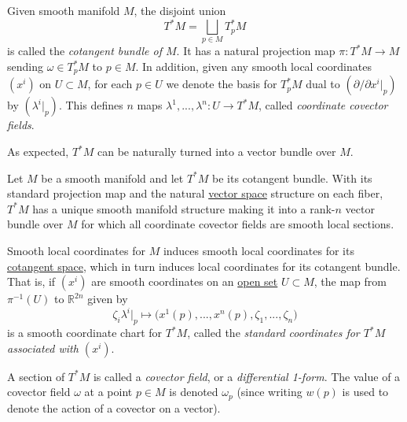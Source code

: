 \documentclass{article}
\newcounter{theorem}[section]
\newcounter{definition}[section]
\begin{document}
    \begin{definition}
      \label{def:cotangent-bundle-of-m}
    Given smooth manifold $M$, the disjoint union 
    \begin{equation}
      T^* M = \bigsqcup_{p \in M} T_p^* M
    \end{equation}
    is called the \textit{cotangent bundle of $M$}. It has a natural projection map $\pi: T^* M \to M$ sending $\omega \in T_p^* M$ to $p \in M$. In addition, given any smooth local coordinates $(x^i)$ on $U \subset M$, for each $p \in U$ we denote the basis for $T_p^* M$ dual to $(\partial / \partial x^i |_p )$ by $(\lambda^i |_p)$. This defines $n$ maps $\lambda^1, ..., \lambda^n: U \to T^* M$, called \textit{coordinate covector fields}. 
    \end{definition}

    As expected, $T^* M$ can be naturally turned into a vector bundle over $M$. 

    \begin{theorem}
      \label{thm:smooth-structure-on-the-cotangent-bundle}
    Let $M$ be a smooth manifold and let $T^* M$ be its cotangent bundle. With its standard projection map and the natural \hyperref[lin-def:vector-space]{vector space} structure on each fiber, $T^*M$ has a unique smooth manifold structure making it into a rank-$n$ vector bundle over $M$ for which all coordinate covector fields are smooth local sections. 
    \end{theorem}

    Smooth local coordinates for $M$ induces smooth local coordinates for its \hyperref[def:cotangent-space]{cotangent space}, which in turn induces local coordinates for its cotangent bundle. That is, if $(x^i)$ are smooth coordinates on an \hyperref[pst-def:open-set]{open set} $U \subset M$, the map from $\pi^{-1} (U)$ to $\mathbb{R}^{2n}$ given by 
    \begin{equation}
      \zeta_i \lambda^i \big|_p \mapsto \big( x^1 (p), ..., x^n(p), \zeta_1, ..., \zeta_n \big)
    \end{equation}
    is a smooth coordinate chart for $T^* M$, called the \textit{standard coordinates for $T^* M$ associated with $(x^i)$}. 

    \begin{definition}
      \label{def:covector-field}
    A section of $T^* M$ is called a \textit{covector field}, or a \textit{differential 1-form}. The value of a covector field $\omega$ at a point $p \in M$ is denoted $\omega_p$ (since writing $w(p)$ is used to denote the action of a covector on a vector). 
    \end{definition}
\end{document}
